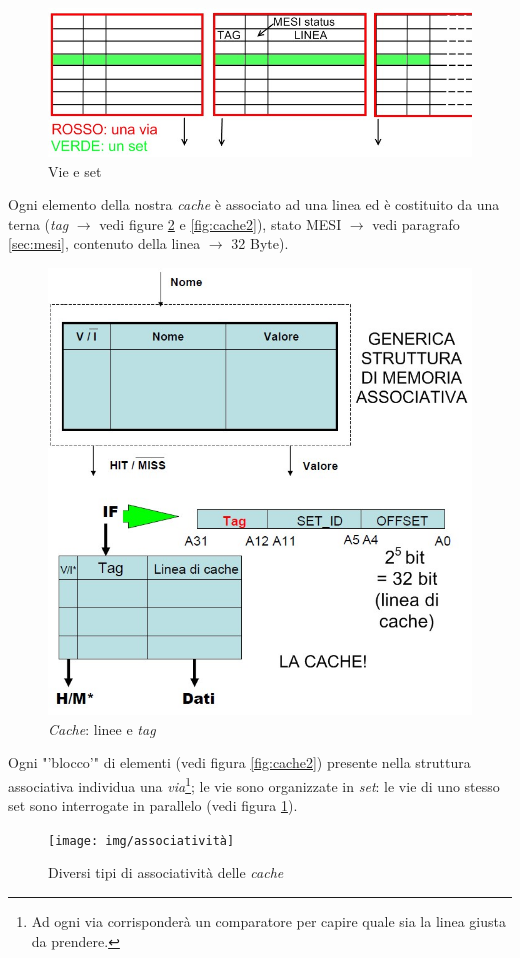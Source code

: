 \begin{figure}[!h]
\centering
\includegraphics[width=0.75\columnwidth]{img/vieset}
\caption{Vie e set}
\label{fig:vieset}
\end{figure}

Ogni elemento della nostra \textit{cache} è associato ad una linea ed è costituito da una terna (\textit{tag} $\to$ vedi figure \ref{fig:tagCache} e \ref{fig:cache2}), stato MESI $\to$ vedi paragrafo \ref{sec:mesi}, contenuto della linea $\to$ 32 Byte).

\begin{figure}[!h]
\centering
\includegraphics[width=0.65\columnwidth]{img/tagCache}
\caption{\textit{Cache}: linee e \textit{tag}}
\label{fig:tagCache}
\end{figure}

Ogni "'blocco'" di elementi (vedi figura \ref{fig:cache2}) presente nella struttura associativa individua una \textit{via}\footnote{Ad ogni via corrisponderà un comparatore per capire quale sia la linea giusta da prendere.}; le vie sono organizzate in \textit{set}: le vie di uno stesso set sono interrogate in parallelo (vedi figura \ref{fig:vieset}). 

\begin{figure}[!h]
\centering
\texttt{[image: img/associatività]}
\caption{Diversi tipi di associatività delle \textit{cache}}
\label{fig:associatività}
\end{figure}

